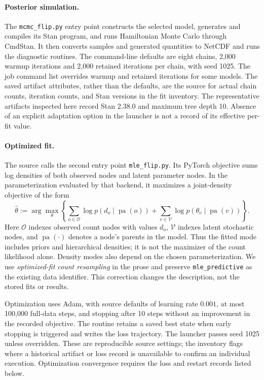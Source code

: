 \paragraph{Posterior simulation.}
The \texttt{mcmc\_flip.py} entry point constructs the selected model,
generates and compiles its Stan program, and runs Hamiltonian Monte Carlo
through CmdStan. It then converts samples and generated quantities to NetCDF
and runs the diagnostic routines. The command-line defaults are eight chains,
2,000 warmup iterations and 2,000 retained iterations per chain, with seed
1025. The job command list overrides warmup and retained iterations for some
models. The saved artifact attributes, rather than the defaults, are the
source for actual chain counts, iteration counts, and Stan versions in the
fit inventory. The representative artifacts inspected here record Stan 2.38.0
and maximum tree depth 10. Absence of an explicit adaptation option in the
launcher is not a record of its effective per-fit value.

\paragraph{Optimized fit.}
The source calls the second entry point \texttt{mle\_flip.py}. Its
PyTorch objective sums log densities of both
observed nodes and latent parameter nodes. In the parameterization evaluated
by that backend, it maximizes a joint-density objective of the form
\[
\hat\theta:=\arg\max_\theta
\left\{\sum_{o\in\mathcal O}\log p(d_o\mid\operatorname{pa}(o))
+\sum_{v\in\mathcal V}\log p(\theta_v\mid\operatorname{pa}(v))\right\}.
\]
Here $\mathcal O$ indexes observed count nodes with values $d_o$,
$\mathcal V$ indexes latent stochastic nodes, and
$\operatorname{pa}(\cdot)$ denotes a node's parents in the model. Thus the
fitted mode includes priors and hierarchical densities; it is not the
maximizer of the count likelihood alone. Density modes also depend on the
chosen parameterization. We use \emph{optimized-fit count resampling} in the
prose and preserve \texttt{mle\_predictive} as the existing data identifier.
This correction changes the description, not the stored fits or results.

Optimization uses Adam, with source defaults of learning rate $0.001$, at
most 100,000 full-data steps, and stopping after 10 steps without an improvement
in the recorded objective. The routine retains a saved best state when early
stopping is triggered and writes the loss trajectory. The launcher passes
seed 1025 unless overridden. These are reproducible source settings; the
inventory flags where a historical artifact or loss record is unavailable
to confirm an individual execution. Optimization convergence requires the
loss and restart records listed below.

